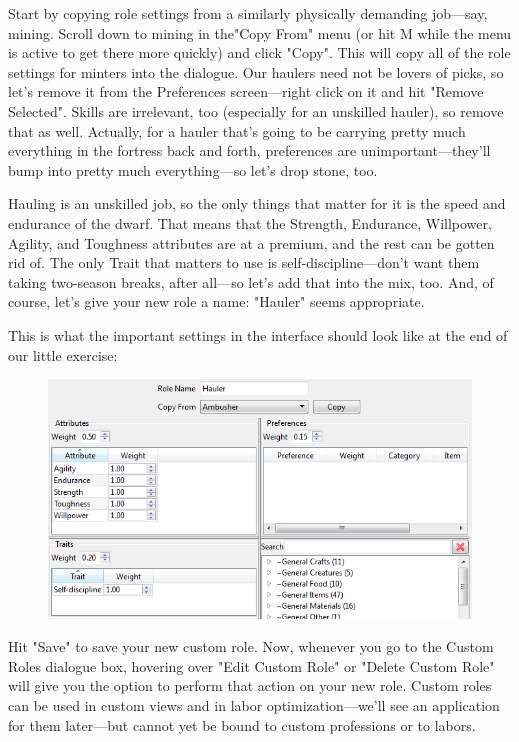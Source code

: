 \documentclass[]{article}
\begin{document}
Start by copying role settings from a similarly physically demanding job---say, mining. Scroll down to
mining in the"Copy From" menu (or hit M while the menu is active to get there more quickly) and click
"Copy". This will copy all of the role settings for minters into the dialogue. Our haulers need not be
lovers of picks, so let's remove it from the Preferences screen---right click on it and hit "Remove
Selected". Skills are irrelevant, too (especially for an unskilled hauler), so remove that as well.
Actually, for a hauler that's going to be carrying pretty much everything in the fortress back and forth,
preferences are unimportant---they'll bump into pretty much everything---so let's drop stone, too.

Hauling is an unskilled job, so the only things that matter for it is the speed and endurance of the
dwarf. That means that the Strength, Endurance, Willpower, Agility, and Toughness attributes are at a
premium, and the rest can be gotten rid of. The only Trait that matters to use is self-discipline---don't
want them taking two-season breaks, after all---so let's add that into the mix, too. And, of course,
let's give your new role a name: "Hauler" seems appropriate.

This is what the important settings in the interface should look like at the end of our little exercise:
\begin{figure}[h!]
\vspace{-5pt}
\centering \includegraphics[width=\linewidth]{Sec3Fig9}
\vspace{-10pt}
\end{figure}

Hit "Save" to save your new custom role. Now, whenever you go to the Custom Roles dialogue box, hovering
over "Edit Custom Role" or "Delete Custom Role" will give you the option to perform that action on your
new role. Custom roles can be used in custom views and in labor optimization---we'll see an application
for them later---but cannot yet be bound to custom professions or to labors.
\end{document}
